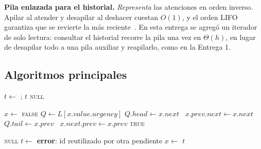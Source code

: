 \textbf{Pila enlazada para el historial.} \emph{Representa} las
atenciones en orden inverso. Apilar al atender y desapilar al deshacer
cuestan $O(1)$, y el orden LIFO garantiza que se revierte la más
reciente~\cite{gof}. En esta entrega se agregó un iterador de solo lectura:
consultar el historial recorre la pila una vez en $\Theta(h)$, en lugar de
desapilar todo a una pila auxiliar y reapilarlo, como en la Entrega 1.

\subsection{Algoritmos principales}

\begin{algorithm}[t]
\caption{Atender la siguiente solicitud}
\label{alg:atender}
\begin{algorithmic}[1]
      \State $t \gets$ 
      \State {}; 
      \State \Return $t$
    \EndIf
  \EndFor
  \State \Return \textsc{null}
\EndFunction
\end{algorithmic}
\end{algorithm}

\begin{algorithm}[t]
\caption{Cancelar una solicitud pendiente}
\label{alg:cancelar}
\begin{algorithmic}[1]
  \State $x \gets$ 
   \Return \textsc{false} \EndIf
  \State $Q \gets L[x.value.urgency]$
   $Q.head \gets x.next$
  \Else\ $x.prev.next \gets x.next$ \EndIf
   $Q.tail \gets x.prev$
  \Else\ $x.next.prev \gets x.prev$ \EndIf
  \State \Return \textsc{true}
\EndFunction
\end{algorithmic}
\end{algorithm}

\begin{algorithm}[t]
\caption{Deshacer la atención más reciente}
\label{alg:deshacer}
\begin{algorithmic}[1]
   \Return \textsc{null} \EndIf
  \State $t \gets$ 
    \State \textbf{error}: id reutilizado por otra pendiente
  \EndIf
  \State {}
  \State $x \gets$ 
  \State {}
  \State \Return $t$
\EndFunction
\end{algorithmic}
\end{algorithm}

